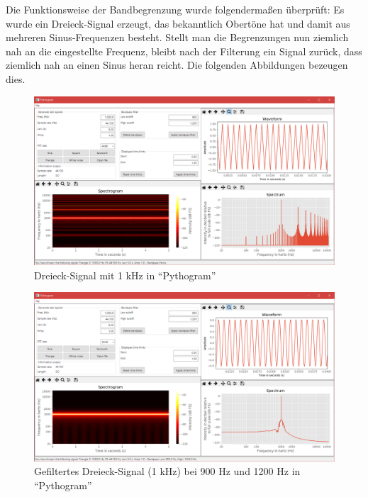 \documentclass[a4paper]{article}
\begin{document}
Die Funktionsweise der Bandbegrenzung wurde folgendermaßen überprüft: Es wurde ein Dreieck-Signal erzeugt, das bekanntlich Obertöne hat und damit aus mehreren Sinus-Frequenzen besteht. Stellt man die Begrenzungen nun ziemlich nah an die eingestellte Frequenz, bleibt nach der Filterung ein Signal zurück, dass ziemlich nah an einen Sinus heran reicht. Die folgenden Abbildungen bezeugen dies.\vspace{2em}
\begin{figure}[H]
    \centering
    \begin{minipage}{1.0\textwidth}
        \centering
        \includegraphics[width=1.0\textwidth]{Bandpass_Triangle.png}
        \caption{Dreieck-Signal mit 1 kHz in "`Pythogram"'}
    \end{minipage}
\end{figure}
\begin{figure}[H]
    \centering
    \begin{minipage}{1.0\textwidth}
        \centering
        \includegraphics[width=1.0\textwidth]{Bandpass_Triangle_to_Sine.png}
        \caption{Gefiltertes Dreieck-Signal (1 kHz) bei 900 Hz und 1200 Hz in "`Pythogram"'}
    \end{minipage}
\end{figure}
\end{document}
